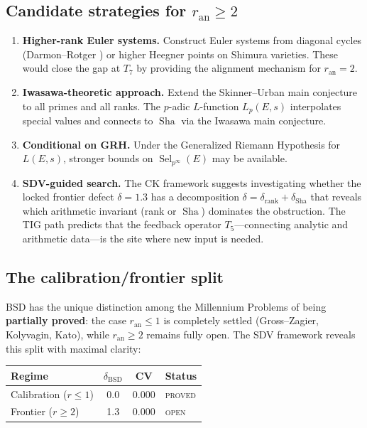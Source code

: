 \documentclass[11pt]{article}
\DeclareMathOperator{\Sha}{Sha}
\DeclareMathOperator{\Sel}{Sel}
\begin{document}
\subsection{Candidate strategies for $r_{\mathrm{an}} \geq 2$}

\begin{enumerate}
  \item \textbf{Higher-rank Euler systems.}  Construct Euler systems from
    diagonal cycles (Darmon--Rotger \cite{DR}) or higher Heegner points on
    Shimura varieties.  These would close the gap at $T_7$ by providing the
    alignment mechanism for $r_{\mathrm{an}} = 2$.

  \item \textbf{Iwasawa-theoretic approach.}  Extend the Skinner--Urban main
    conjecture \cite{SU} to all primes and all ranks.  The $p$-adic
    $L$-function $L_p(E,s)$ interpolates special values and connects to $\Sha$
    via the Iwasawa main conjecture.

  \item \textbf{Conditional on GRH.}  Under the Generalized Riemann Hypothesis
    for $L(E,s)$, stronger bounds on $\Sel_{p^\infty}(E)$ may be available.

  \item \textbf{SDV-guided search.}  The CK framework suggests investigating
    whether the locked frontier defect $\delta = 1.3$ has a decomposition
    $\delta = \delta_{\mathrm{rank}} + \delta_{\mathrm{Sha}}$ that reveals which
    arithmetic invariant (rank or $\Sha$) dominates the obstruction.  The TIG
    path predicts that the feedback operator $T_5$---connecting analytic and
    arithmetic data---is the site where new input is needed.
\end{enumerate}

\subsection{The calibration/frontier split}

BSD has the unique distinction among the Millennium Problems of being
\textbf{partially proved}: the case $r_{\mathrm{an}} \leq 1$ is completely
settled (Gross--Zagier, Kolyvagin, Kato), while $r_{\mathrm{an}} \geq 2$
remains fully open.  The SDV framework reveals this split with maximal clarity:

\begin{center}
\begin{tabular}{lccl}
\hline
\textbf{Regime} & $\delta_{\mathrm{BSD}}$ & CV & \textbf{Status} \\
\hline
Calibration ($r \leq 1$) & 0.0 & 0.000 & \textsc{proved} \\
Frontier ($r \geq 2$) & 1.3 & 0.000 & \textsc{open} \\
\hline
\end{tabular}
\end{center}
\end{document}
